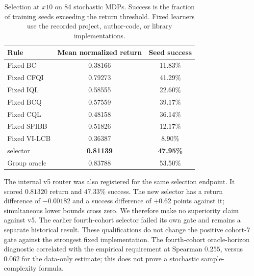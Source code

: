 \begin{table}[t]
\centering
\caption{Selection at $x10$ on 84 stochastic MDPs. Success is the fraction of training seeds exceeding the return threshold. Fixed learners use the recorded project, author-code, or library implementations.}
\label{tab:selection}
\begin{tabular}{lcc}
\toprule
Rule & Mean normalized return & Seed success\\
\midrule
Fixed BC & 0.38166 & 11.83\%\\
Fixed CFQI & 0.79273 & 41.29\%\\
Fixed IQL & 0.58555 & 22.60\%\\
Fixed BCQ & 0.57559 & 39.17\%\\
Fixed CQL & 0.48158 & 36.14\%\\
Fixed SPIBB & 0.51826 & 12.17\%\\
Fixed VI-LCB & 0.36387 & 8.90\%\\
\midrule
\OEH{} selector & \textbf{0.81139} & \textbf{47.95\%}\\
Group oracle & 0.83788 & 53.50\%\\
\bottomrule
\end{tabular}
\end{table}

The internal v5 router was also registered for the same selection endpoint. It scored $0.81320$ return and $47.33\%$ success. The new selector has a return difference of $-0.00182$ and a success difference of $+0.62$ points against it; simultaneous lower bounds cross zero. We therefore make no superiority claim against v5. The earlier fourth-cohort selector failed its own gate and remains a separate historical result. These qualifications do not change the positive cohort-7 gate against the strongest fixed implementation. The fourth-cohort oracle-horizon diagnostic correlated with the empirical requirement at Spearman $0.255$, versus $0.062$ for the data-only estimate; this does not prove a stochastic sample-complexity formula.
